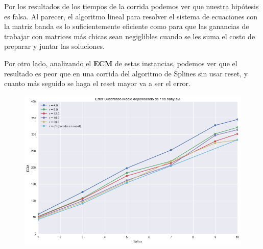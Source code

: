 Por los resultados de los tiempos de la corrida podemos ver que nuestra
hip\'otesis es falsa. Al parecer, el algoritmo lineal para resolver el sistema
de ecuaciones con la matriz banda es lo suficientemente eficiente como para que
las ganancias de trabajar con matrices m\'as chicas sean negiglibles cuando se
les suma el costo de preparar y juntar las soluciones.

Por otro lado, analizando el \textbf{ECM} de estas instancias, podemos ver que
el resultado es peor que en una corrida del algoritmo de Splines sin usar reset,
y cuanto m\'as seguido se haga el reset mayor va a ser el error.

\begin{figure}[H]
\centering
\includegraphics[width=.95\textwidth]{graficos/ecm_reset.png}
\end{figure}
